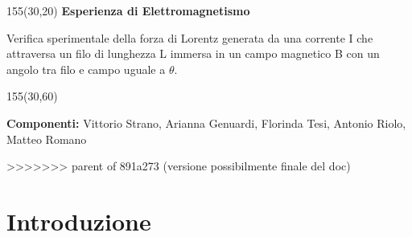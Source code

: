 \documentclass{article}
\begin{document}
\begin{center}
\vspace*{5.8cm}

\setlength{\TPHorizModule}{1mm}
\setlength{\TPVertModule}{\TPHorizModule}

\newlength{\backupparindent}
\setlength{\backupparindent}{\parindent}
\setlength{\parindent}{0mm}

\begin{textblock}{155}(30,20)
    \vspace*{1mm}
    \huge
    \textbf{Esperienza di Elettromagnetismo\\}
    \LARGE
    \vspace*{5mm}
    \begin{flushleft}
    {Verifica sperimentale della forza di Lorentz generata da una corrente I che attraversa un filo di lunghezza L immersa in un campo magnetico B con un angolo tra filo e campo uguale a $\theta$.}
    \\
    \end{flushleft}
    \textbf{}
    \par
    \vspace*{15mm}
    \Large
    \begin{textblock}{155}(30,60)
    \begin{flushleft}
        \Large
           
            
             \textbf{Componenti:} Vittorio Strano, Arianna Genuardi, Florinda Tesi, Antonio Riolo, Matteo Romano
            
            
            


    \end{flushleft}
    \end{textblock}
\end{textblock}




\setlength{\parindent}{\backupparindent}
\end{center}





\tableofcontents*
>>>>>>> parent of 891a273 (versione possibilmente finale del doc)



\newpage
\section{Introduzione}
 
\end{document}
